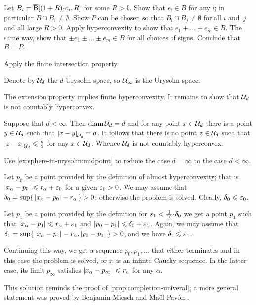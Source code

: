 Let $B_i=\cBall[(1+R)\cdot e_i,R]$ for some $R>0$.
Show that $ e_i\in B$ for any $i$; in particular $B\cap B_i\ne\emptyset$.
Show $P$ can be chosen so that $B_i\cap B_j\ne \emptyset$ for all $i$ and~$j$ and all large $R>0$.
Apply hyperconvexity to show that $e_1+\dots+ e_m\in B$.
The same way, show that $\pm e_1\pm \dots\pm e_m\in B$ for all choices of signs.
Conclude that $B=P$.

 Apply the finite intersection property.

Denote by $\mathcal{U}_d$ the $d$-Urysohn space,
so $\mathcal{U}_\infty$ is the Urysohn space.

The extension property implies finite hyperconvexity.
It remains to show that $\mathcal{U}_d$ is not countably hyperconvex.

Suppose that $d<\infty$.
Then $\operatorname{\rm diam}\nolimits\mathcal{U}_d=d$ and for any point $x\in\mathcal{U}_d$ there is a point $y\in\mathcal{U}_d$ such that $\dist{x}{y}{\spc{U}_d}=d$.
It follows that there is no point $z\in\mathcal{U}_d$ such that $\dist{z}{x}{\spc{U}_d}\le \tfrac d2$ for any $x\in\mathcal{U}_d$.
Whence $\mathcal{U}_d$ is not countably hyperconvex.

Use \ref{ex:sphere-in-urysohn:midpoint} to reduce the case $d=\infty$ to the case $d<\infty$.

Let $p_0$ be a point provided by the definition of almost hyperconvexity;
that is $\dist{x_\alpha}{p_0}{}\le r_\alpha+\eps_0$ for a given $\varepsilon_0>0$.
We may assume that $\delta_0=\sup\{\,\dist{x_\alpha}{p_0}{}- r_\alpha\,\}>0$; otherwise the problem is solved.
Clearly, $\delta_0\leqslant \varepsilon_0$.

Let $p_1$ be a point provided by the definition for $\eps_1<\tfrac1{10}\cdot\delta_0$ we get a point 
$p_1$ such that $\dist{x_\alpha}{p_1}{}\le r_\alpha+\eps_1$ and $\dist{p_0}{p_1}{}\le \delta_0+\eps_1$.
Again, we may assume that $\delta_1=\sup\{\,\dist{x_\alpha}{p_1}{}- r_\alpha,\dist{p_0}{p_1}{}\,\}>0$, and we have $\delta_1\leqslant \varepsilon_1$.

Continuing this way, we get a sequence $p_0,p_1,\dots$ that either terminates and in this case the problem is solved, or it is an infinte Cauchy sequence.
In the latter case, its limit $p_\infty$ satisfies $\dist{x_\alpha}{p_\infty}{}\le r_\alpha$ for any $\alpha$.

This solution reminds the proof of \ref{prop:completion-univeral};
a more general statement was proved by Benjamin Miesch and Maël Pavón \cite[2.2]{miesch-pavon2016}.


